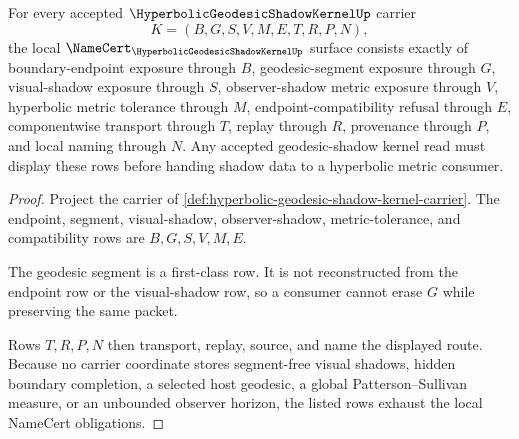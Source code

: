 \begin{theorem}
\label{thm:hyperbolic-geodesic-shadow-kernel-obligations}
For every accepted $\HyperbolicGeodesicShadowKernelUp$ carrier
$$
K=(B,G,S,V,M,E,T,R,P,N),
$$
the local $\NameCert_{\HyperbolicGeodesicShadowKernelUp}$ surface consists exactly of boundary-endpoint exposure through $B$, geodesic-segment exposure through $G$, visual-shadow exposure through $S$, observer-shadow metric exposure through $V$, hyperbolic metric tolerance through $M$, endpoint-compatibility refusal through $E$, componentwise transport through $T$, replay through $R$, provenance through $P$, and local naming through $N$. Any accepted geodesic-shadow kernel read must display these rows before handing shadow data to a hyperbolic metric consumer.
\end{theorem}
\begin{proof}
Project the carrier of \autoref{def:hyperbolic-geodesic-shadow-kernel-carrier}. The endpoint, segment, visual-shadow, observer-shadow, metric-tolerance, and compatibility rows are $B,G,S,V,M,E$.

The geodesic segment is a first-class row. It is not reconstructed from the endpoint row or the visual-shadow row, so a consumer cannot erase $G$ while preserving the same packet.

Rows $T,R,P,N$ then transport, replay, source, and name the displayed route. Because no carrier coordinate stores segment-free visual shadows, hidden boundary completion, a selected host geodesic, a global Patterson--Sullivan measure, or an unbounded observer horizon, the listed rows exhaust the local NameCert obligations.
\end{proof}

